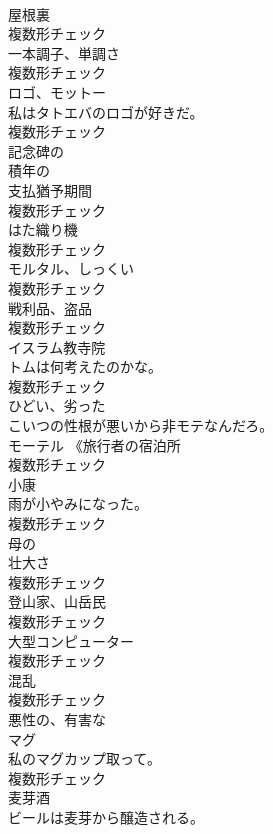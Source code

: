 \documentclass[8pt]{extreport}
\begin{document}
\begin{CJK}{UTF8}{min}
\\	[名詞]	屋根裏	
\\	複数形チェック
\\	[名詞]	一本調子、単調さ	
\\	複数形チェック
\\	[名詞]	ロゴ、モットー	
\\	私はタトエバのロゴが好きだ。	
\\	複数形チェック
\\	[形容詞]	記念碑の	
\\	[形容詞]	積年の	
\\	[名詞]	支払猶予期間	
\\	複数形チェック
\\	[名詞]	はた織り機	
\\	複数形チェック
\\	[名詞]	モルタル、しっくい	
\\	複数形チェック
\\	[名詞]	戦利品、盗品	
\\	複数形チェック
\\	[名詞]	イスラム教寺院	
\\	トムは何考えたのかな。	
\\	複数形チェック
\\	[形容詞]	ひどい、劣った	
\\	こいつの性根が悪いから非モテなんだろ。	
\\	[名詞]	モーテル 《旅行者の宿泊所	
\\	複数形チェック
\\	[名詞]	小康	
\\	雨が小やみになった。	
\\	複数形チェック
\\	[形容詞]	母の	
\\	[名詞]	壮大さ	
\\	複数形チェック
\\	[名詞]	登山家、山岳⺠	
\\	複数形チェック
\\	[名詞]	大型コンピューター	
\\	複数形チェック
\\	[名詞]	混乱	
\\	複数形チェック
\\	[形容詞]	悪性の、有害な	
\\	[名詞]	マグ	
\\	私のマグカップ取って。	
\\	複数形チェック
\\	[名詞]	⻨芽酒	
\\	ビールは麦芽から醸造される。	

\end{CJK}
\end{document}

